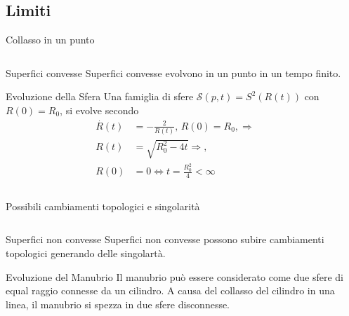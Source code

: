 \subsection*{Limiti}
\begin{frame}{Collasso in un punto}
  \begin{columns}[c]
    \begin{column}{6cm}
      \begin{block}{Superfici convesse}
       Superfici convesse  evolvono in un
       punto in un tempo finito.
       \end{block}
      \begin{exampleblock}{Evoluzione della Sfera}
        Una famiglia di sfere $\mathcal{S}(p,t)=S^2(R(t))$ con
        $R(0)=R_0$, si evolve secondo
        \[
        \begin{aligned}
          \overset{\displaystyle.}{R}(t) &= -\frac{2}{R(t)},\,
          R(0)=R_0,\Rightarrow\\
          R(t)&=\sqrt{R_0^2-4t}\Rightarrow, \\
          R(0)&=0 \Longleftrightarrow t=\frac{R_0^2}{4}<\infty 
        \end{aligned}
        \]
      \end{exampleblock}
    \end{column}
    \begin{column}[c]{4cm}
       \begin{center}
     \end{center}
    \end{column}
    \end{columns}
\end{frame}
\begin{frame}{Possibili cambiamenti topologici e singolarità}
  \begin{columns}[c]
    \begin{column}{6cm}
      \begin{block}{Superfici non convesse}
       Superfici non convesse possono subire cambiamenti topologici
       generando delle singolartà. 
       \end{block}
      \begin{exampleblock}{Evoluzione del Manubrio}
        Il manubrio può essere considerato come due sfere di equal
        raggio connesse da un cilindro. A causa del collasso del
        cilindro in una linea, il manubrio si spezza in due sfere
        disconnesse.
      \end{exampleblock}
    \end{column}
    \begin{column}[c]{4cm}
       \begin{center}
     \end{center}
    \end{column}
    \end{columns}
\end{frame}

